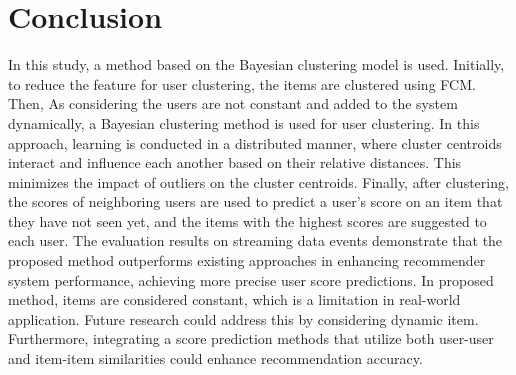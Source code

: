 \documentclass{article}
\theoremstyle{plain}
\theoremstyle{definition}
\theoremstyle{remark}
\begin{document}
\section{Conclusion}
In this study, a method based on the Bayesian clustering model is used. Initially, to reduce the feature for user clustering, the items are clustered using FCM. Then, As considering the users are not constant and added to the system dynamically, a Bayesian clustering method is used for user clustering. In this approach, learning is conducted in a distributed manner, where cluster centroids interact and influence each another based on their relative distances. This minimizes the impact of outliers on the cluster centroids. Finally, after clustering, the scores of neighboring users are used to predict a user's score on an item that they have not seen yet, and the items with the highest scores are suggested to each user. The evaluation results on streaming data events demonstrate that the proposed method outperforms existing approaches in enhancing recommender system performance, achieving more precise user score predictions. In proposed method, items are considered constant, which is a limitation in real-world application. Future research could address this by considering dynamic item. Furthermore, integrating a score prediction methods that utilize both user-user and item-item similarities could enhance recommendation accuracy.

% 
\printbibliography
\end{document}
